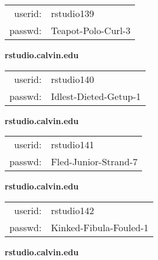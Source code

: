 \documentclass{article}\usepackage[]{graphicx}\usepackage[]{color}
\begin{document}
\begin{multicols}{3}
\begin{minipage}{.3\textwidth}
\begin{tabular}{rl}
userid: & rstudio139\\
passwd: & Teapot-Polo-Curl-3

\vspace{5mm}

\end{tabular}\end{minipage}

\vspace{5mm}

\begin{minipage}{.3\textwidth}
\centerline{\textbf{rstudio.calvin.edu}}
\medskip
\begin{tabular}{rl}

userid: & rstudio140\\
passwd: & Idlest-Dieted-Getup-1

\vspace{5mm}

\end{tabular}\end{minipage}

\vspace{5mm}

\begin{minipage}{.3\textwidth}
\centerline{\textbf{rstudio.calvin.edu}}
\medskip
\begin{tabular}{rl}

userid: & rstudio141\\
passwd: & Fled-Junior-Strand-7

\vspace{5mm}

\end{tabular}\end{minipage}

\vspace{5mm}

\begin{minipage}{.3\textwidth}
\centerline{\textbf{rstudio.calvin.edu}}
\medskip
\begin{tabular}{rl}

userid: & rstudio142\\
passwd: & Kinked-Fibula-Fouled-1

\vspace{5mm}

\end{tabular}\end{minipage}

\vspace{5mm}

\begin{minipage}{.3\textwidth}
\centerline{\textbf{rstudio.calvin.edu}}
\medskip
\begin{tabular}{rl}


\end{tabular}
\end{minipage}
\end{multicols}
\end{document}
